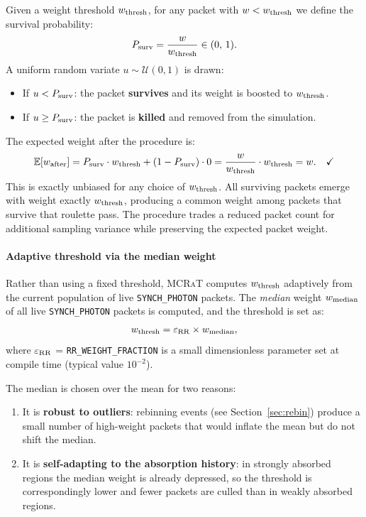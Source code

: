 \documentclass[12pt,a4paper]{article}
\newcommand{\code}[1]{\texttt{#1}}
\newcommand{\mcrat}{\textsc{MCRaT}}
\begin{document}
Given a weight threshold $w_{\rm thresh}$, for any packet with
$w < w_{\rm thresh}$ we define the survival probability:
\begin{equation}
	P_{\rm surv} = \frac{w}{w_{\rm thresh}} \in (0,\,1).
	\label{eq:p_surv}
\end{equation}
A uniform random variate $u \sim \mathcal{U}(0,1)$ is drawn:
\begin{itemize}
	\item If $u < P_{\rm surv}$: the packet \textbf{survives} and its
	weight is boosted to $w_{\rm thresh}$.
	\item If $u \ge P_{\rm surv}$: the packet is \textbf{killed} and
	removed from the simulation.
\end{itemize}
The expected weight after the procedure is:
\begin{equation}
	\mathbb{E}[w_{\rm after}]
	= P_{\rm surv} \cdot w_{\rm thresh}
	+ (1 - P_{\rm surv}) \cdot 0
	= \frac{w}{w_{\rm thresh}} \cdot w_{\rm thresh}
	= w. \quad \checkmark
	\label{eq:rr_unbiased}
\end{equation}
This is exactly unbiased for any choice of $w_{\rm thresh}$.  All
surviving packets emerge with weight exactly $w_{\rm thresh}$, producing a common weight among packets that survive that roulette pass.
The procedure trades a reduced packet count for additional sampling
variance while preserving the expected packet weight.

\paragraph{Adaptive threshold via the median weight}

Rather than using a fixed threshold, \mcrat{} computes $w_{\rm thresh}$
adaptively from the current population of live \code{SYNCH\_PHOTON}
packets.  The \emph{median} weight $w_{\rm median}$ of all live
\code{SYNCH\_PHOTON} packets is computed, and the threshold is set as:
\begin{equation}
	w_{\rm thresh} = \varepsilon_{\rm RR} \times w_{\rm median},
	\label{eq:w_thresh}
\end{equation}
where $\varepsilon_{\rm RR}$ = \code{RR\_WEIGHT\_FRACTION} is a small
dimensionless parameter set at compile time (typical value $10^{-2}$).

The median is chosen over the mean for two reasons:
\begin{enumerate}
	\item It is \textbf{robust to outliers}: rebinning events (see
	Section~\ref{sec:rebin}) produce a small number of high-weight
	packets that would inflate the mean but do not shift the median.
	\item It is \textbf{self-adapting to the absorption history}: in
	strongly absorbed regions the median weight is already depressed, so
	the threshold is correspondingly lower and fewer packets are culled
	than in weakly absorbed regions.
\end{enumerate}
\end{document}
